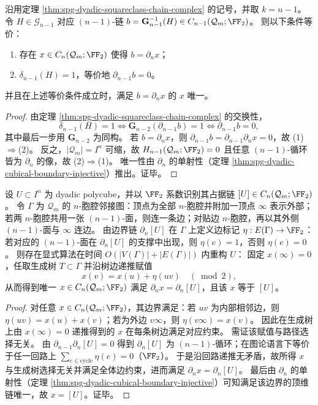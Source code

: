 \begin{corollary}\label{cor:spg-dyadic-boundary-syndrome-fillability}
沿用定理 \ref{thm:spg-dyadic-squareclass-chain-complex} 的记号，并取 \(k=n-1\)。
令 \(H\in\mathcal G_{n-1}\) 对应 \((n-1)\)-链 \(b=\mathbf G_{n-1}^{-1}(H)\in C_{n-1}(\mathcal Q_m;\FF_2)\)。
则以下条件等价：
\begin{enumerate}
  \item 存在 \(x\in C_n(\mathcal Q_m;\FF_2)\) 使得 \(b=\partial_n x\)；
  \item \(\delta_{n-1}(H)=1\)，等价地 \(\partial_{n-1}b=0\)。
\end{enumerate}
并且在上述等价条件成立时，满足 \(b=\partial_n x\) 的 \(x\) 唯一。
\end{corollary}
\begin{proof}
由定理 \ref{thm:spg-dyadic-squareclass-chain-complex} 的交换性，
\[
\delta_{n-1}(H)=1
\iff
\mathbf G_{n-2}(\partial_{n-1}b)=1
\iff
\partial_{n-1}b=0,
\]
其中最后一步用 \(\mathbf G_{n-2}\) 为同构。
若 \(b=\partial_n x\)，则 \(\partial_{n-1}b=\partial_{n-1}\partial_n x=0\)，故 (1)\(\Rightarrow\)(2)。
反之，\(|\mathcal Q_m|=I^n\) 可缩，故 \(H_{n-1}(\mathcal Q_m;\FF_2)=0\) 且任意 \((n-1)\)-循环皆为 \(\partial_n\) 的像，故 (2)\(\Rightarrow\)(1)。
唯一性由 \(\partial_n\) 的单射性（定理 \ref{thm:spg-dyadic-cubical-boundary-injective}）推出。证毕。
\end{proof}

\begin{theorem}\label{thm:spg-linear-time-bulk-decode-from-boundary}
设 \(U\subset I^n\) 为 dyadic polycube，并以 \(\FF_2\) 系数识别其占据链 \([U]\in C_n(\mathcal Q_m;\FF_2)\)。
令 \(\Gamma\) 为 \(\mathcal Q_m\) 的 \(n\)-胞腔邻接图：顶点为全部 \(n\)-胞腔并附加一顶点 \(\infty\) 表示外部；若两 \(n\)-胞腔共用一张 \((n-1)\)-面，则连一条边；对贴边 \(n\)-胞腔，再以其外侧 \((n-1)\)-面与 \(\infty\) 连边。
由边界链 \(\partial_n[U]\) 在 \(\Gamma\) 上定义边标记 \(\eta:E(\Gamma)\to\FF_2\)：若对应的 \((n-1)\)-面在 \(\partial_n[U]\) 的支撑中出现，则 \(\eta(e)=1\)，否则 \(\eta(e)=0\)。
则存在显式算法在时间 \(O(|V(\Gamma)|+|E(\Gamma)|)\) 内重构 \(U\)：
固定 \(x(\infty)=0\)，任取生成树 \(T\subset\Gamma\) 并沿树边递推赋值
\[
x(v)=x(u)+\eta(uv)\quad(\bmod 2),
\]
从而得到唯一 \(x\in C_n(\mathcal Q_m;\FF_2)\) 满足 \(\partial_n x=\partial_n[U]\)，且该 \(x\) 等于 \([U]\)。
\end{theorem}
\begin{proof}
对任意 \(x\in C_n(\mathcal Q_m;\FF_2)\)，其边界满足：若 \(uv\) 为内部相邻边，则 \(\eta(uv)=x(u)+x(v)\)；若为外边 \(v\infty\)，则 \(\eta(v\infty)=x(v)\)。
因此在生成树上由 \(x(\infty)=0\) 递推得到的 \(x\) 在每条树边满足对应约束。
需证该赋值与路径选择无关。
由 \(\partial_{n-1}\partial_n[U]=0\) 得到 \(\partial_n[U]\) 为 \((n-1)\)-循环；在图论语言下等价于任一回路上 \(\sum_{e\in\mathrm{cycle}}\eta(e)=0\)（\(\FF_2\)）。
于是沿回路递推无矛盾，故所得 \(x\) 与生成树选择无关并满足全体边约束，进而满足 \(\partial_n x=\partial_n[U]\)。
最后由 \(\partial_n\) 的单射性（定理 \ref{thm:spg-dyadic-cubical-boundary-injective}）可知满足该边界的顶维链唯一，故 \(x=[U]\)。证毕。
\end{proof}

